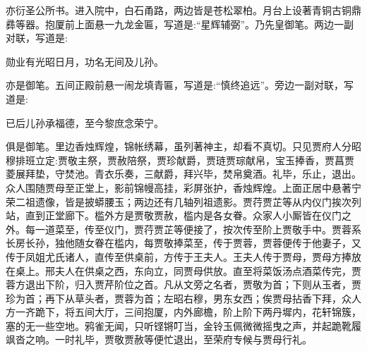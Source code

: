 \begin{parag}
    亦衍圣公所书。进入院中，白石甬路，两边皆是苍松翠柏。月台上设著青铜古铜鼎彞等器。抱厦前上面悬一九龙金匾，写道是:“星辉辅弼”。乃先皇御笔。两边一副对联，写道是:
\end{parag}


\begin{poem}
    \begin{pl}勋业有光昭日月，功名无间及儿孙。\end{pl}

\end{poem}


\begin{parag}
    亦是御笔。五间正殿前悬一闹龙填青匾，写道是:“慎终追远”。旁边一副对联，写道是:
\end{parag}


\begin{poem}
    \begin{pl}已后儿孙承福德，至今黎庶念荣宁。\end{pl}

\end{poem}


\begin{parag}
    俱是御笔。里边香烛辉煌，锦帐绣幕，虽列著神主，却看不真切。只见贾府人分昭穆排班立定:贾敬主祭，贾赦陪祭，贾珍献爵，贾琏贾琮献帛，宝玉捧香，贾菖贾菱展拜垫，守焚池。青衣乐奏，三献爵，拜兴毕，焚帛奠酒。礼毕，乐止，退出。众人围随贾母至正堂上，影前锦幔高挂，彩屏张护，香烛辉煌。上面正居中悬著宁荣二祖遗像，皆是披蟒腰玉；两边还有几轴列祖遗影。贾荇贾芷等从内仪门挨次列站，直到正堂廊下。槛外方是贾敬贾赦，槛内是各女眷。众家人小厮皆在仪门之外。每一道菜至，传至仪门，贾荇贾芷等便接了，按次传至阶上贾敬手中。贾蓉系长房长孙，独他随女眷在槛内，每贾敬捧菜至，传于贾蓉，贾蓉便传于他妻子，又传于凤姐尤氏诸人，直传至供桌前，方传于王夫人。王夫人传于贾母，贾母方捧放在桌上。邢夫人在供桌之西，东向立，同贾母供放。直至将菜饭汤点酒菜传完，贾蓉方退出下阶，归入贾芹阶位之首。凡从文旁之名者，贾敬为首；下则从玉者，贾珍为首；再下从草头者，贾蓉为首；左昭右穆，男东女西；俟贾母拈香下拜，众人方一齐跪下，将五间大厅，三间抱厦，内外廊檐，阶上阶下两丹墀内，花轩锦簇，塞的无一些空地。鸦雀无闻，只听铿锵叮当，金铃玉佩微微摇曳之声，并起跪靴履飒沓之响。一时礼毕，贾敬贾赦等便忙退出，至荣府专候与贾母行礼。
\end{parag}


